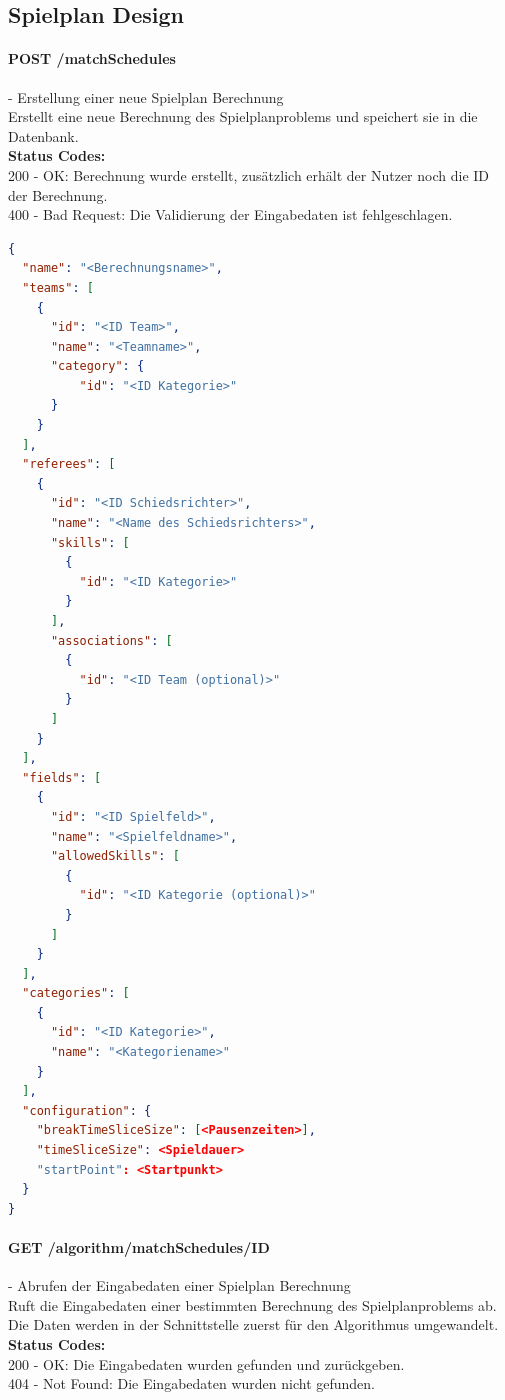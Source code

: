 %
%
%
%

\subsection{Spielplan Design}

\paragraph{POST /matchSchedules} - Erstellung einer neue Spielplan Berechnung\mbox{}\\
Erstellt eine neue Berechnung des Spielplanproblems und speichert sie in die Datenbank.\\
\textbf{Status Codes:}\\
200 - OK: Berechnung wurde erstellt, zusätzlich erhält der Nutzer noch die ID der Berechnung.\\
400 - Bad Request: Die Validierung der Eingabedaten ist fehlgeschlagen.\\

\begin{lstlisting}[language=JSON, caption=Beispiel einer Eingabe für das Spielplanproblem, label=lst:input_matchScheduling]  
{
  "name": "<Berechnungsname>",
  "teams": [
    {
      "id": "<ID Team>",
      "name": "<Teamname>",
      "category": {
          "id": "<ID Kategorie>"
      }
    }
  ],
  "referees": [
    {
      "id": "<ID Schiedsrichter>",
      "name": "<Name des Schiedsrichters>",
      "skills": [
        {
          "id": "<ID Kategorie>"
        }
      ],
      "associations": [
        {
          "id": "<ID Team (optional)>"
        }
      ]
    }
  ],
  "fields": [
    {
      "id": "<ID Spielfeld>",
      "name": "<Spielfeldname>",
      "allowedSkills": [
        {
          "id": "<ID Kategorie (optional)>"
        }
      ]
    }
  ],
  "categories": [
    {
      "id": "<ID Kategorie>",
      "name": "<Kategoriename>"
    }
  ],
  "configuration": {
    "breakTimeSliceSize": [<Pausenzeiten>],
    "timeSliceSize": <Spieldauer>
    "startPoint": <Startpunkt>
  }
}
\end{lstlisting}

\paragraph{GET /algorithm/matchSchedules/{ID}} - Abrufen der Eingabedaten einer Spielplan Berechnung\mbox{}\\
Ruft die Eingabedaten einer bestimmten Berechnung des Spielplanproblems ab. Die Daten werden in der Schnittstelle zuerst für den Algorithmus umgewandelt.\\
\textbf{Status Codes:}\\
200 - OK: Die Eingabedaten wurden gefunden und zurückgeben.\\
404 - Not Found: Die Eingabedaten wurden nicht gefunden.\\


